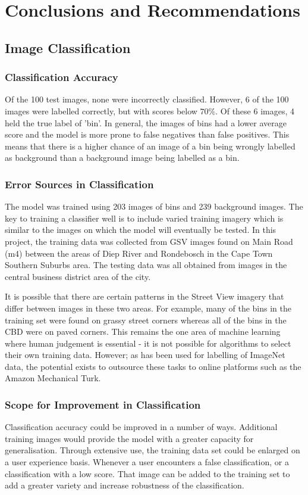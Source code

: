 \chapter{Conclusions and Recommendations}
\label{conclusions}

\section{Image Classification}

\subsection{Classification Accuracy}
Of the 100 test images, none were incorrectly classified. However, 6 of the 100 images were labelled correctly, but with scores below $70\%$. Of these 6 images, 4 held the true label of 'bin'. In general, the images of bins had a lower average score and the model is more prone to false negatives than false positives. This means that there is a higher chance of an image of a bin being wrongly labelled as background than a background image being labelled as a bin.

\subsection{Error Sources in Classification}
The model was trained using 203 images of bins and 239 background images. The key to training a classifier well is to include varied training imagery which is similar to the images on which the model will eventually be tested. In this project, the training data was collected from GSV images found on Main Road (m4) between the areas of Diep River and Rondebosch in the Cape Town Southern Suburbs area. The testing data was all obtained from images in the central business district area of the city.

It is possible that there are certain patterns in the Street View imagery that differ between images in these two areas. For example, many of the bins in the training set were found on grassy street corners whereas all of the bins in the CBD were on paved corners. This remains the one area of machine learning where human judgement is essential - it is not possible for algorithms to select their own training data. However; as has been used for labelling of ImageNet data, the potential exists to outsource these tasks to online platforms such as the Amazon Mechanical Turk. 

\subsection{Scope for Improvement in Classification}
Classification accuracy could be improved in a number of ways. Additional training images would provide the model with a greater capacity for generalisation. Through extensive use, the training data set could be enlarged on a user experience basis. Whenever a user encounters a false classification, or a classification with a low score. That image can be added to the training set to add a greater variety and increase robustness of the classification.

